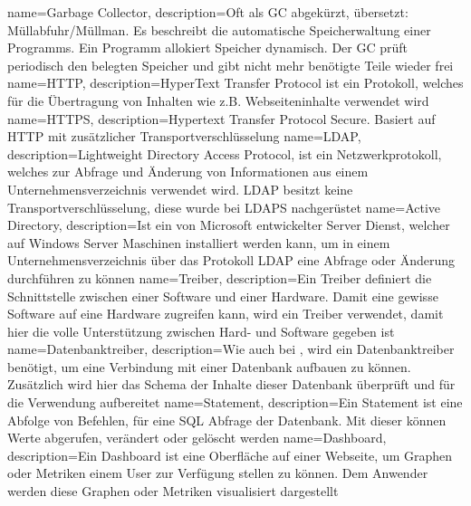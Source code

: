 {
  name=Garbage Collector,
  description={Oft als GC abgekürzt, übersetzt: Müllabfuhr/Müllman. Es
               beschreibt die automatische Speicherwaltung einer Programms.
               Ein Programm allokiert Speicher dynamisch. Der GC prüft
               periodisch den belegten Speicher und gibt nicht mehr benötigte
               Teile wieder frei}
}
{
  name=HTTP,
  description={HyperText Transfer Protocol ist ein
              Protokoll, welches für die Übertragung von Inhalten wie z.B.
              Webseiteninhalte verwendet wird}
}
{
  name=HTTPS,
  description={Hypertext Transfer Protocol Secure. Basiert auf
              \gls{HTTP} mit zusätzlicher Transportverschlüsselung}
}
{
  name=LDAP,
  description={Lightweight Directory Access Protocol, ist
            ein Netzwerkprotokoll, welches zur Abfrage und Änderung von
            Informationen aus einem Unternehmensverzeichnis verwendet wird.
            LDAP besitzt keine Transportverschlüsselung, diese wurde bei LDAPS
            nachgerüstet}
}
{
  name=Active Directory,
  description={Ist ein von Microsoft entwickelter Server Dienst, welcher auf
              Windows Server Maschinen installiert werden kann, um in einem
              Unternehmensverzeichnis über das Protokoll \gls{LDAP} eine
              Abfrage oder Änderung durchführen zu können}
}
{
  name=Treiber,
  description={Ein Treiber definiert die Schnittstelle zwischen einer
              Software und einer Hardware. Damit eine gewisse Software auf
              eine Hardware zugreifen kann, wird ein Treiber verwendet,
              damit hier die volle Unterstützung zwischen Hard- und Software
              gegeben ist}
}
{
  name=Datenbanktreiber,
  description={Wie auch bei , wird ein
              Datenbanktreiber benötigt, um eine Verbindung mit einer
              Datenbank aufbauen zu können. Zusätzlich wird hier
              das Schema der Inhalte dieser Datenbank überprüft und
              für die Verwendung aufbereitet}
}
{
  name=Statement,
  description={Ein Statement ist eine Abfolge von Befehlen, für eine \gls{SQL}
              Abfrage der Datenbank. Mit dieser können Werte abgerufen,
              verändert oder gelöscht werden}
}
{
  name=Dashboard,
  description={Ein Dashboard ist eine Oberfläche auf einer Webseite, um Graphen
              oder Metriken einem User zur Verfügung stellen zu können. Dem
              Anwender werden diese Graphen oder Metriken visualisiert
              dargestellt}
}
